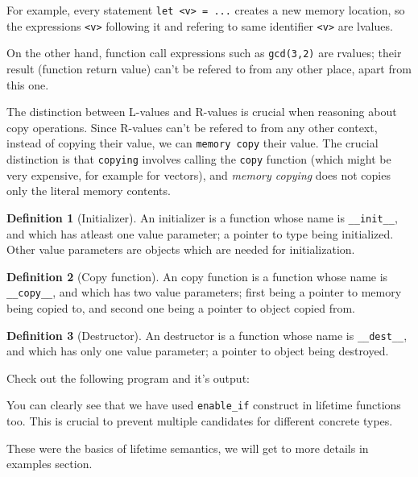 \documentclass[times, utf8, diplomski]{fer}
\theoremstyle{definition}
\newtheorem{definition}{Definition}[]
\newcommand{\textcode}[3]{
    
}
\begin{document}
For example, every statement \texttt{let <v> = ...} creates a new memory location,
so the expressions \texttt{<v>} following it and refering to same identifier \texttt{<v>} are lvalues.

On the other hand, function call expressions such as \texttt{gcd(3,2)} are rvalues; their result
(function return value) can't be refered to from any other place, apart from this one.

The distinction between L-values and R-values is crucial when reasoning about copy operations.
Since R-values can't be refered to from any other context, instead of copying their value, 
we can \texttt{memory copy} their value. The crucial distinction is that \texttt{copying}
involves calling the \texttt{copy} function (which might be very expensive, for example for vectors),
and \textit{memory copying} does not copies only the literal memory contents.

\begin{definition}[Initializer]
An initializer is a function whose name is \texttt{__init__}, and which has atleast one value parameter;
a pointer to type being initialized. Other value parameters are objects which are needed for initialization.
\end{definition}

\begin{definition}[Copy function]
An copy function is a function whose name is \texttt{__copy__}, and which has two value parameters;
first being a pointer to memory being copied to, and second one being a pointer to object copied from.
\end{definition}

\begin{definition}[Destructor]
An destructor is a function whose name is \texttt{__dest__}, and which has only one value parameter;
a pointer to object being destroyed.
\end{definition}

Check out the following program and it's output:

\textcode{\resdir/compiler/lifetime_ex.agt}{}{a}
\textcode{\resdir/compiler/lifetime_ex.out}{}{a}

You can clearly see that we have used \texttt{enable\_if} construct in lifetime functions too.
This is crucial to prevent multiple candidates for different concrete types.

These were the basics of lifetime semantics, we will get to more details in examples section.
\end{document}

